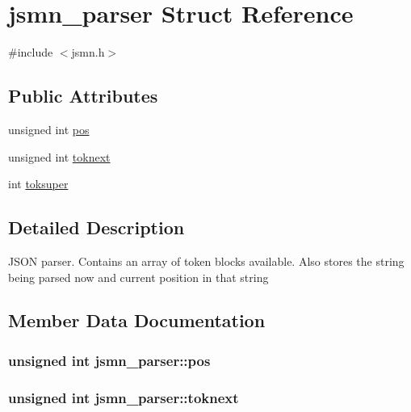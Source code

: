 \hypertarget{structjsmn__parser}{}\section{jsmn\+\_\+parser Struct Reference}
\label{structjsmn__parser}


{\ttfamily \#include $<$jsmn.\+h$>$}

\subsection*{Public Attributes}
\begin{DoxyCompactItemize}
\item 
unsigned int \hyperlink{structjsmn__parser_a3d0d6e48d3d5b24262f9e0c2241dc456}{pos}
\item 
unsigned int \hyperlink{structjsmn__parser_af640efd7d154218124a964b65f114bff}{toknext}
\item 
int \hyperlink{structjsmn__parser_af11fcec48d9f1298909777a12f1d1e39}{toksuper}
\end{DoxyCompactItemize}


\subsection{Detailed Description}
J\+S\+ON parser. Contains an array of token blocks available. Also stores the string being parsed now and current position in that string 

\subsection{Member Data Documentation}
\subsubsection[{\texorpdfstring{pos}{pos}}]{\setlength{\rightskip}{0pt plus 5cm}unsigned int jsmn\+\_\+parser\+::pos}\hypertarget{structjsmn__parser_a3d0d6e48d3d5b24262f9e0c2241dc456}{}\label{structjsmn__parser_a3d0d6e48d3d5b24262f9e0c2241dc456}
\subsubsection[{\texorpdfstring{toknext}{toknext}}]{\setlength{\rightskip}{0pt plus 5cm}unsigned int jsmn\+\_\+parser\+::toknext}\hypertarget{structjsmn__parser_af640efd7d154218124a964b65f114bff}{}\label{structjsmn__parser_af640efd7d154218124a964b65f114bff}
